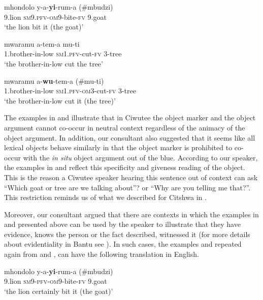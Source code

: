 \documentclass[output=paper]{langscibook}
\begin{document}
\ex\label{ex:ngunga:41b} \gll mhondolo  y-a-\textbf{yi}{}-rum-a    (\#mbudzi) \\
             9.lion    {\textsc{sm9}.\textsc{pfv}-\textsc{om}9}{}-bite-{\textsc{fv}}      9.goat\\
\glt    ‘the lion bit it (the goat)’

\ex\label{ex:ngunga:41c} \gll   mwaramu    a-tem-a    mu-ti\\
            1.brother-in-low  {\textsc{sm1}.\textsc{pfv}}{}-cut-{\textsc{fv}}    3-tree\\
\glt            ‘the brother-in-low cut the tree’

\ex\label{ex:ngunga:41d} \gll   mwaramu    a-\textbf{wu}{}-tem-a    (\#mu-ti)\\
    1.brother-in-low  {\textsc{sm1}.\textsc{pfv}-\textsc{om}3}{}-cut-{\textsc{fv}}  3-tree\\
\glt    ‘the brother-in-low cut it (the tree)’
    \z
\z

The examples in  and  illustrate that in Ciwutee the object marker and the object argument cannot co-occur in neutral context regardless of the animacy of the object argument. In addition, our consultant also suggested that it seems like all lexical objects behave similarly in that the object marker is prohibited to co-occur with the \textit{in situ} object argument out of the blue. According to our speaker, the examples in  and  reflect this specificity and giveness reading of the object. This is the reason a Ciwutee speaker hearing this sentence out of context can ask ``Which goat or tree are we talking about''? or ``Why are you telling me that?''. This restriction reminds us of what we described for Citshwa in . 

  Moreover, our consultant argued that there are contexts in which the examples in  and  presented above can be used by the speaker to illustrate that they have evidence, knows the person or the fact described, witnessed it (for more details about evidentiality in Bantu see \citealt{LippardEtAl2021}). In such cases, the examples  and  repeated again from  and , can have the following translation in English. 

\ea\label{ex:ngunga:42}
\ea\label{ex:ngunga:42a} \gll    mhondolo  y-a-\textbf{yi}{}-rum-a    (\#mbudzi) \\
      9.lion    {\textsc{sm9}-\textsc{pfv}-\textsc{om}9}{}-bite-{\textsc{fv}}  9.goat\\
      \glt ‘the lion certainly bit it (the goat)’
\end{document}
